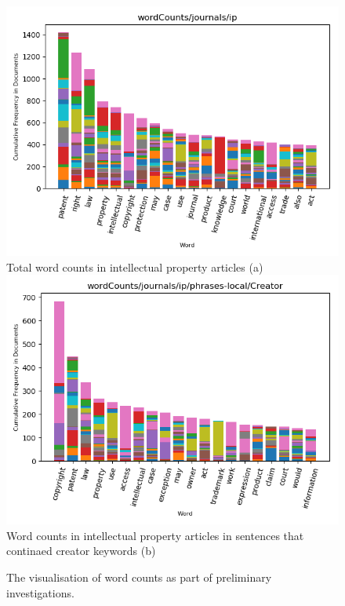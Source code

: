 			\begin{figure}
					\centering
  					\includegraphics[width=\linewidth]{resources/images/prelim_total_count.png}\\
  					Total word counts in intellectual property articles (a)
  				\endminipage\hfill
  					\centering
  					\includegraphics[width=\linewidth]{resources/images/prelim_local_count.png}\\
  					Word counts in intellectual property articles in sentences that continaed creator keywords (b)
  				\endminipage\hfill\caption{The visualisation of word counts as part of preliminary investigations.}\label{fig:prelim-count}
			\end{figure}
			
